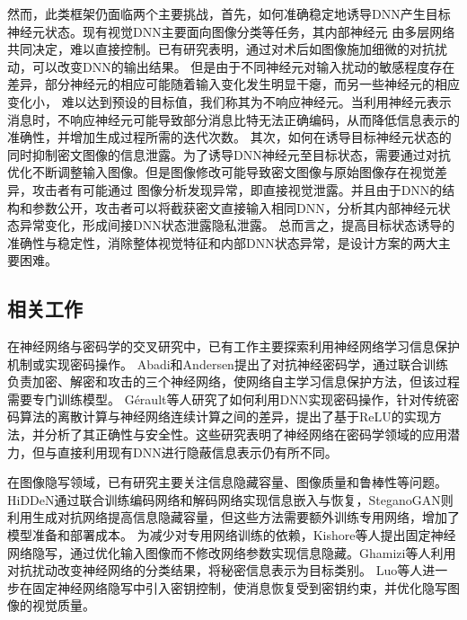 然而，此类框架仍面临两个主要挑战，首先，如何准确稳定地诱导DNN产生目标神经元状态。现有视觉DNN主要面向图像分类等任务，其内部神经元
由多层网络共同决定，难以直接控制。已有研究表明，通过对术后如图像施加细微的对抗扰动，可以改变DNN的输出结果\supercite{10-szegedy-et-al-2014,11-goodfellow-et-al-2015}。
但是由于不同神经元对输入扰动的敏感程度存在差异\supercite{12-zhang-et-al-2019-sensitivity,13-suri-evans-2020}，部分神经元的相应可能随着输入变化发生明显干瘪，而另一些神经元的相应变化小，
难以达到预设的目标值，我们称其为不响应神经元。当利用神经元表示消息时，不响应神经元可能导致部分消息比特无法正确编码，从而降低信息表示的准确性，并增加生成过程所需的迭代次数。
其次，如何在诱导目标神经元状态的同时抑制密文图像的信息泄露。为了诱导DNN神经元至目标状态，需要通过对抗优化不断调整输入图像。但是图像修改可能导致密文图像与原始图像存在视觉差异，攻击者有可能通过
图像分析发现异常，即直接视觉泄露\supercite{14-hu-et-al-2024}。并且由于DNN的结构和参数公开，攻击者可以将截获密文直接输入相同DNN，分析其内部神经元状态异常变化，形成间接DNN状态泄露隐私泄露。
总而言之，提高目标状态诱导的准确性与稳定性，消除整体视觉特征和内部DNN状态异常，是设计方案的两大主要困难。

\subsection{相关工作}
在神经网络与密码学的交叉研究中，已有工作主要探索利用神经网络学习信息保护机制或实现密码操作。
Abadi和Andersen\supercite{6-abadi-andersen-2016}提出了对抗神经密码学，通过联合训练负责加密、解密和攻击的三个神经网络，使网络自主学习信息保护方法，但该过程需要专门训练模型。
Gérault等人\supercite{7-gerault-et-al-2026}研究了如何利用DNN实现密码操作，针对传统密码算法的离散计算与神经网络连续计算之间的差异，提出了基于ReLU的实现方法，并分析了其正确性与安全性。这些研究表明了神经网络在密码学领域的应用潜力，但与直接利用现有DNN进行隐蔽信息表示仍有所不同。

在图像隐写领域，已有研究主要关注信息隐藏容量、图像质量和鲁棒性等问题\supercite{2-yang-et-al-2024,16-yao-et-al-2024,17-li-et-al-2025,18-liu-et-al-2026}。
HiDDeN\supercite{3-zhu-et-al-2018}通过联合训练编码网络和解码网络实现信息嵌入与恢复，SteganoGAN\supercite{4-zhang-et-al-2019-steganogan}则利用生成对抗网络提高信息隐藏容量，但这些方法需要额外训练专用网络，增加了模型准备和部署成本。
为减少对专用网络训练的依赖，Kishore等人\supercite{19-kishore-et-al-2021}提出固定神经网络隐写，通过优化输入图像而不修改网络参数实现信息隐藏。Ghamizi等人\supercite{20-ghamizi-et-al-2021}利用对抗扰动改变神经网络的分类结果，将秘密信息表示为目标类别。
Luo等人\supercite{8-luo-et-al-2023}进一步在固定神经网络隐写中引入密钥控制，使消息恢复受到密钥约束，并优化隐写图像的视觉质量。
